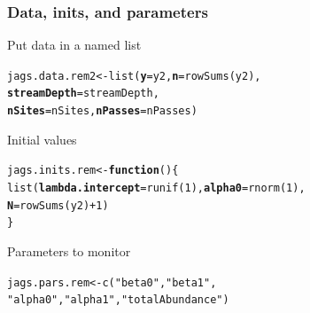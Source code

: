 \documentclass[color=usenames,dvipsnames]{beamer}\usepackage[]{graphicx}\usepackage[]{color}
\makeatletter
\newcommand{\hlnum}[1]{\textcolor[rgb]{0.69,0.494,0}{#1}}%
\newcommand{\hlstr}[1]{\textcolor[rgb]{0.749,0.012,0.012}{#1}}%
\newcommand{\hlopt}[1]{\textcolor[rgb]{0,0,0}{#1}}%
\newcommand{\hlstd}[1]{\textcolor[rgb]{0,0,0}{#1}}%
\newcommand{\hlkwa}[1]{\textcolor[rgb]{0,0,0}{\textbf{#1}}}%
\newcommand{\hlkwb}[1]{\textcolor[rgb]{0,0.341,0.682}{#1}}%
\newcommand{\hlkwc}[1]{\textcolor[rgb]{0,0,0}{\textbf{#1}}}%
\newcommand{\hlkwd}[1]{\textcolor[rgb]{0.004,0.004,0.506}{#1}}%
\newenvironment{kframe}{%
 \def\at@end@of@kframe{}%
 \ifinner\ifhmode%
  \def\at@end@of@kframe{\end{minipage}}%
  \begin{minipage}{\columnwidth}%
 \fi\fi%
 \def\FrameCommand##1{\hskip\@totalleftmargin \hskip-\fboxsep
 \colorbox{shadecolor}{##1}\hskip-\fboxsep
     \hskip-\linewidth \hskip-\@totalleftmargin \hskip\columnwidth}%
 \MakeFramed {\advance\hsize-\width
   \@totalleftmargin\z@ \linewidth\hsize
   \@setminipage}}%
 {\par\unskip\endMakeFramed%
 \at@end@of@kframe}
\newenvironment{knitrout}{}{} %
\makeatother
\begin{document}
\begin{frame}[fragile]
  \frametitle{Data, inits, and parameters}
  Put data in a named list
  \vspace{-12pt}
\begin{knitrout}\small
{}\color{fgcolor}\begin{kframe}
\begin{alltt}
\hlstd{jags.data.rem2} \hlkwb{<-} \hlkwd{list}\hlstd{(}\hlkwc{y}\hlstd{=y2,} \hlkwc{n}\hlstd{=}\hlkwd{rowSums}\hlstd{(y2),}
                       \hlkwc{streamDepth}\hlstd{=streamDepth,}
                       \hlkwc{nSites}\hlstd{=nSites,} \hlkwc{nPasses}\hlstd{=nPasses)}
\end{alltt}
\end{kframe}
\end{knitrout}
\pause
\vfill
  Initial values
  \vspace{-12pt}
\begin{knitrout}\small
{}\color{fgcolor}\begin{kframe}
\begin{alltt}
\hlstd{jags.inits.rem} \hlkwb{<-} \hlkwa{function}\hlstd{() \{}
    \hlkwd{list}\hlstd{(}\hlkwc{lambda.intercept}\hlstd{=}\hlkwd{runif}\hlstd{(}\hlnum{1}\hlstd{),} \hlkwc{alpha0}\hlstd{=}\hlkwd{rnorm}\hlstd{(}\hlnum{1}\hlstd{),}
         \hlkwc{N}\hlstd{=}\hlkwd{rowSums}\hlstd{(y2)}\hlopt{+}\hlnum{1}\hlstd{)}
\hlstd{\}}
\end{alltt}
\end{kframe}
\end{knitrout}
\pause
\vfill
  Parameters to monitor
  \vspace{-12pt}
\begin{knitrout}\small
{}\color{fgcolor}\begin{kframe}
\begin{alltt}
\hlstd{jags.pars.rem} \hlkwb{<-} \hlkwd{c}\hlstd{(}\hlstr{"beta0"}\hlstd{,} \hlstr{"beta1"}\hlstd{,}
                   \hlstr{"alpha0"}\hlstd{,} \hlstr{"alpha1"}\hlstd{,} \hlstr{"totalAbundance"}\hlstd{)}
\end{alltt}
\end{kframe}
\end{knitrout}
\end{frame}
\end{document}

